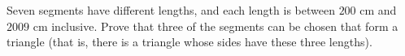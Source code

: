 Seven segments have different lengths, and each length is between $200$ cm and $2009$ cm inclusive. Prove that three of the segments can be chosen that form a triangle (that is, there is a triangle whose sides have these three lengths).
